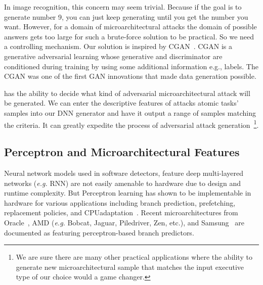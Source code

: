 
 In image recognition, this concern may seem trivial. Because if the goal is to generate number 9, you can just keep generating until you get the number you want. However, for a domain of microarchitectural attacks the domain of possible answers gets too large for such a brute-force solution to be practical. So we need a controlling mechanism.
Our solution is inspired by CGAN~\cite{cgan}. CGAN is a generative adversarial learning whose generative and discriminator are conditioned during training by using some additional information e.g., labels. The CGAN was one of the first GAN innovations that made data generation possible.  
 
 {\scheme} has the ability to decide what kind of adversarial microarchitectural attack will be generated. We can enter the descriptive features of attacks atomic tasks' samples into our DNN generator and have it output a range of samples matching the criteria. It can greatly expedite the process of adversarial attack generation~\footnote{We are sure there are many other practical applications where the ability to generate new microarchitectural sample that matches the input executive type of our choice would a game changer.}.
 
 \subsection{Perceptron and Microarchitectural Features}

 


Neural network models used in software detectors, feature deep multi-layered  networks ({\em e.g.} RNN) are not easily amenable to hardware due to design and runtime complexity. But Perceptron learning has shown to be implementable in hardware for various  applications including branch prediction, prefetching, replacement policies, and CPUadaptation~\cite{intelISCA2019}. Recent microarchitectures from Oracle~\cite{SPARCT4}, AMD ({\em e.g.} Bobcat, Jaguar, Piledriver, Zen, etc.), and Samsung~\cite{Mongoose,M3} are documented as featuring perceptron-based branch predictors.
 
